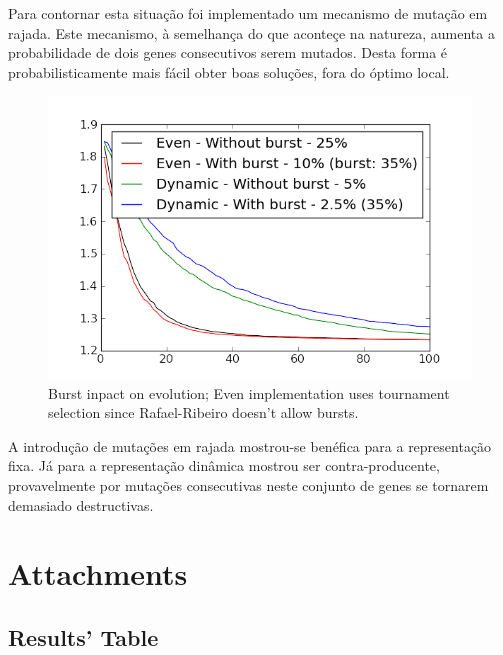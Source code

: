 \documentclass[a4paper]{article}
\begin{document}
\indent Para contornar esta situação foi implementado um mecanismo de mutação em rajada. Este mecanismo, à semelhança
do que aconteçe na natureza, aumenta a probabilidade de dois genes consecutivos serem mutados. Desta forma é probabilisticamente
mais fácil obter boas soluções, fora do óptimo local. 

\begin{figure}[ht]
	\centering
	\includegraphics[scale=0.7]{images/burst.png}
	\caption{Burst inpact on evolution; Even implementation uses tournament selection since Rafael-Ribeiro doesn't allow bursts.}
	\label{fig:gui}
\end{figure}

\indent A introdução de mutações em rajada mostrou-se benéfica para a representação fixa. Já para a representação
dinâmica mostrou ser contra-producente, provavelmente por mutações consecutivas neste conjunto de genes se tornarem demasiado destructivas.

\cleardoublepage

\eject \pdfpagewidth=594.0mm \pdfpageheight=420.0mm
\paperwidth=594.0mm
\paperheight=420.0mm

\section{Attachments}

\subsection{Results' Table}
\label{sec:results}
\begin{center}
	
\end{center}
\end{document}
